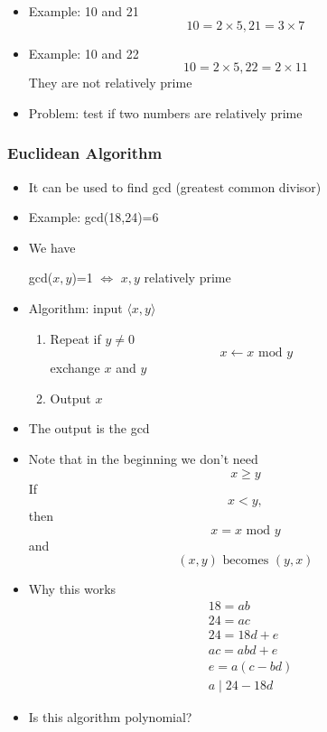 \begin{frame}[allowframebreaks]
\begin{itemize}
\item Example: 10 and 21
  \begin{equation*}
10=2 \times 5, 21
=3\times 7
\end{equation*}
\item Example: 10 and 22
  \begin{equation*}
10=2 \times 5, 22
=2\times 11
\end{equation*}
They are not relatively prime
\item Problem: test if two numbers are relatively
prime
\end{itemize}\end{frame} \begin{frame}[allowframebreaks] \frametitle{Euclidean Algorithm}
  \begin{itemize}
\item It can be used to find gcd (greatest common divisor)
\item Example:  gcd(18,24)=6
\item We have
  \begin{center}
gcd($x,y$)=1
$\Leftrightarrow$ $x,y$ relatively prime
\end{center}
\item Algorithm: input $\langle  x,y\rangle $
  \begin{enumerate}
  \item Repeat if $y \neq 0$
    \begin{equation*}
x \leftarrow x \text{ mod } y
\end{equation*}
exchange $x$ and $y$
\item Output $x$
  \end{enumerate}
\item The output is the gcd
\item Note that in the beginning we don't need
  \begin{equation*}
    x\geq y
  \end{equation*}
If
\begin{equation*}
  x < y,
\end{equation*}
then
\begin{equation*}
  x = x \text{ mod } y
\end{equation*}
and
\begin{equation*}
  (x,y) \text{ becomes } (y,x)
\end{equation*}
\item Why this works
  \begin{equation*}
    \begin{split}
& 18=ab \\
& 24=ac \\
& 24 = 18d + e \\
& ac=abd + e \\
& e = a (c-bd) \\
& a \mid  24-18d
\end{split}
\end{equation*}
\item Is this algorithm polynomial?


\end{itemize}
\end{frame}
